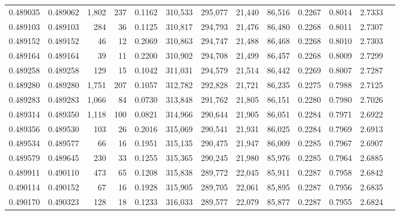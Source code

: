 \begin{tabular}{rrrrrrrrrrrrr}
0.489035 & 0.489062 & 1,802 &   237 &                                     0.1162 & 310,533 & 295,077 &  21,440 &  86,516 & 0.2267 & 0.8014 & 2.7333 \\
0.489103 & 0.489103 &   284 &    36 &                                     0.1125 & 310,817 & 294,793 &  21,476 &  86,480 & 0.2268 & 0.8011 & 2.7307 \\
0.489152 & 0.489152 &    46 &    12 &                                     0.2069 & 310,863 & 294,747 &  21,488 &  86,468 & 0.2268 & 0.8010 & 2.7303 \\
0.489164 & 0.489164 &    39 &    11 &                                     0.2200 & 310,902 & 294,708 &  21,499 &  86,457 & 0.2268 & 0.8009 & 2.7299 \\
0.489258 & 0.489258 &   129 &    15 &                                     0.1042 & 311,031 & 294,579 &  21,514 &  86,442 & 0.2269 & 0.8007 & 2.7287 \\
0.489280 & 0.489280 & 1,751 &   207 &                                     0.1057 & 312,782 & 292,828 &  21,721 &  86,235 & 0.2275 & 0.7988 & 2.7125 \\
0.489283 & 0.489283 & 1,066 &    84 &                                     0.0730 & 313,848 & 291,762 &  21,805 &  86,151 & 0.2280 & 0.7980 & 2.7026 \\
0.489314 & 0.489350 & 1,118 &   100 &                                     0.0821 & 314,966 & 290,644 &  21,905 &  86,051 & 0.2284 & 0.7971 & 2.6922 \\
0.489356 & 0.489530 &   103 &    26 &                                     0.2016 & 315,069 & 290,541 &  21,931 &  86,025 & 0.2284 & 0.7969 & 2.6913 \\
0.489534 & 0.489577 &    66 &    16 &                                     0.1951 & 315,135 & 290,475 &  21,947 &  86,009 & 0.2285 & 0.7967 & 2.6907 \\
0.489579 & 0.489645 &   230 &    33 &                                     0.1255 & 315,365 & 290,245 &  21,980 &  85,976 & 0.2285 & 0.7964 & 2.6885 \\
0.489911 & 0.490110 &   473 &    65 &                                     0.1208 & 315,838 & 289,772 &  22,045 &  85,911 & 0.2287 & 0.7958 & 2.6842 \\
0.490114 & 0.490152 &    67 &    16 &                                     0.1928 & 315,905 & 289,705 &  22,061 &  85,895 & 0.2287 & 0.7956 & 2.6835 \\
0.490170 & 0.490323 &   128 &    18 &                                     0.1233 & 316,033 & 289,577 &  22,079 &  85,877 & 0.2287 & 0.7955 & 2.6824 \\

\end{tabular}

